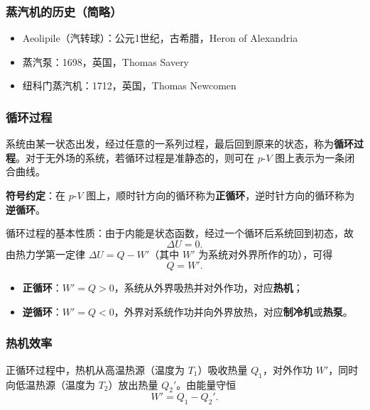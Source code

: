 \documentclass[UTF8]{ctexart}
\theoremstyle{definition}
\begin{document}
\subsubsection*{蒸汽机的历史（简略）}

\begin{itemize}
    \item Aeolipile（汽转球）：公元1世纪，古希腊，Heron of Alexandria
    \item 蒸汽泵：1698，英国，Thomas Savery
    \item 纽科门蒸汽机：1712，英国，Thomas Newcomen
\end{itemize}

\subsubsection*{循环过程}

系统由某一状态出发，经过任意的一系列过程，最后回到原来的状态，称为\textbf{循环过程}。对于无外场的系统，若循环过程是准静态的，则可在 $p$-$V$ 图上表示为一条闭合曲线。

\textbf{符号约定}：在 $p$-$V$ 图上，顺时针方向的循环称为\textbf{正循环}，逆时针方向的循环称为\textbf{逆循环}。

循环过程的基本性质：由于内能是状态函数，经过一个循环后系统回到初态，故
\begin{equation}
\Delta U = 0.
\end{equation}
由热力学第一定律 $\Delta U = Q - W'$（其中 $W'$ 为系统对外界所作的功），可得
\begin{equation}
Q = W'.
\end{equation}

\begin{itemize}
\item \textbf{正循环}：$W' = Q > 0$，系统从外界吸热并对外作功，对应\textbf{热机}；
\item \textbf{逆循环}：$W' = Q < 0$，外界对系统作功并向外界放热，对应\textbf{制冷机}或\textbf{热泵}。
\end{itemize}

\subsubsection*{热机效率}

正循环过程中，热机从高温热源（温度为 $T_1$）吸收热量 $Q_1$，对外作功 $W'$，同时向低温热源（温度为 $T_2$）放出热量 $Q_2'$。由能量守恒
\begin{equation}
W' = Q_1 - Q_2'.
\end{equation}
\end{document}
